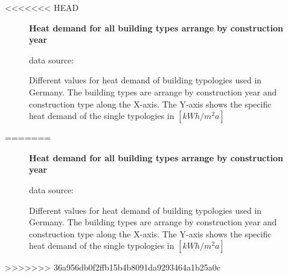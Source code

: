 <<<<<<< HEAD
\begin{figure}[htb]
	\centering
\textbf{Heat demand for all building types arrange by construction year}
		
		\begin{flushright}
		\footnotesize{data source:
		\cite{
		Born.2003,
		Blesl.2007,
		BSU.2011,
		Hermelink.2011,
		Loga.2011}}
		\end{flushright}
	\caption[Different values of heat demand of building typologies used in
	Germany.]{ Different values for heat demand of building typologies used in
	Germany.
	The building types are arrange by construction year and construction type along the X-axis.
	The Y-axis shows the specific heat demand of the single typologies in
	$[kWh/m^2a]$}
	\label{fig:DifTyp}
\end{figure}
=======
\begin{figure}[htb]
	\centering
\textbf{Heat demand for all building types arrange by construction year}
		
		\begin{flushright}
		\footnotesize{data source:
		\cite{
		Born.2003,
		Blesl.2007,
		BSU.2011,
		Hermelink.2011,
		Loga.2011}}
		\end{flushright}
	\caption[Different values of heat demand of building typologies used in
	Germany.]{ Different values for heat demand of building typologies used in
	Germany.
	The building types are arrange by construction year and construction type along the X-axis.
	The Y-axis shows the specific heat demand of the single typologies in
	$[kWh/m^2a]$}
	\label{fig:DifTyp}
\end{figure}
>>>>>>> 36a956db0f2ffb15b4b8091da9293464a1b25a0c
